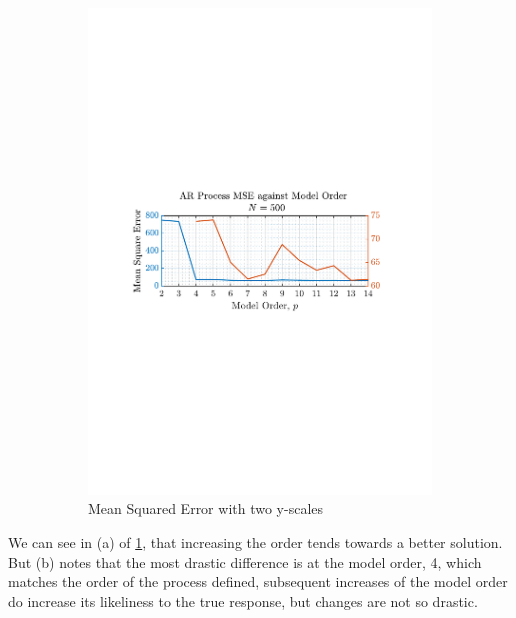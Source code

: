 \documentclass[12pt]{article}
\begin{document}
\begin{figure}[H]
\begin{subfigure}{0.49\textwidth}
			\includegraphics[trim={2.2cm 11.2cm 3.15cm  11.2cm}, clip, width=\textwidth]{../MATLAB/figures/q1_4b_fig16.pdf} 
			\captionsetup{justification=centering}
			\caption{Mean Squared Error with two y-scales}
		\end{subfigure}
		\captionsetup{justification=centering}
		\caption{}
		\label{fig: 1-4b}
	\end{figure}

	We can see in (a) of \ref{fig: 1-4b}, that increasing the order tends towards a better solution. But (b) notes that the most drastic difference is at the model order, 4, which matches the order of the process defined, subsequent increases of the model order do increase its likeliness to the true response, but changes are not so drastic.
	
\end{document}
